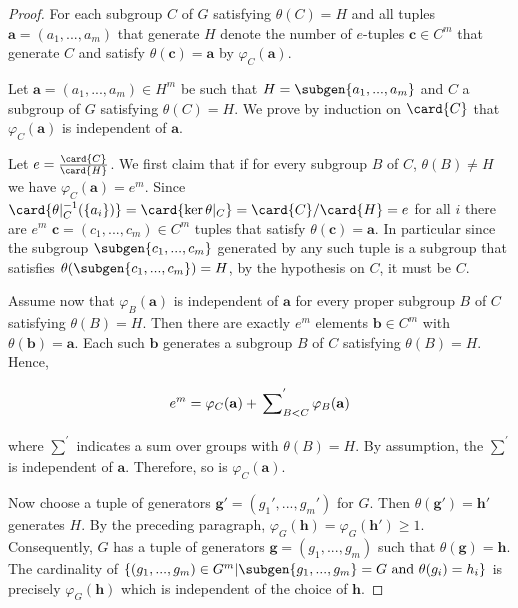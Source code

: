 \begin{proof}
    For each subgroup $C$ of $G$ satisfying $\theta(C) = H$ and all tuples $\mathbf{a} = (a_1,...,a_m)$ that generate $H$ denote the number of $e$-tuples $\mathbf{c} \in C^m$ that generate $C$ and satisfy $\theta(\mathbf{c}) = \mathbf{a}$ by $\varphi_C(\mathbf{a})$. 
    
    Let $\mathbf{a} = (a_1,...,a_m) \in H^m$ be such that $H = \subgen{a_1, ..., a_m}$ and $C$ a subgroup of $G$ satisfying $\theta(C) = H$.
    We prove by induction on $\card{C}$ that $\varphi_C(\mathbf{a})$ is independent of $\mathbf{a}$.

    Let $e = \frac{\card{C}}{\card{H}}$.
    We first claim that if for every subgroup $B$ of $C$, $\theta(B) \ne H$ we have $\varphi_C(\mathbf{a}) = e^m$. Since $\card{\theta|_{C}^{-1}(\{a_i\})} = \card{\ker \theta|_{C}} = \card{C}/\card{H} = e$ for all $i$ there are $e^m$ $\mathbf{c} = (c_1, ..., c_m) \in C^m$ tuples that satisfy $\theta(\mathbf{c}) = \mathbf{a}$. In particular since the subgroup $\subgen{c_1, ..., c_m}$ generated by any such tuple is a subgroup that satisfies $\theta(\subgen{c_1, ..., c_m}) = H$, by the hypothesis on $C$, it must be $C$. 
    
    Assume now that $\varphi_B(\mathbf{a})$ is independent of $\mathbf{a}$ for every proper subgroup $B$ of $C$ satisfying $\theta(B) = H$. Then there are exactly $e^m$ elements $\mathbf{b} \in C^m$ with $\theta(\mathbf{b}) = \mathbf{a}$. Each such $\mathbf{b}$ generates a subgroup $B$ of $C$ satisfying $\theta(B) = H$. Hence,
    $$
    e^m = \varphi_C(\mathbf{a}) + \sideset{}{}{\sum_{B < C}^{'}} \varphi_B(\mathbf{a})
    $$
    where $\sum_{}^{'}$ indicates a sum over groups with $\theta(B) = H$. By assumption, the $\sum_{}^{'}$ is independent of $\mathbf{a}$. Therefore, so is $\varphi_C(\mathbf{a})$.

    Now choose a tuple of generators $\mathbf{g'} = (g_1', ..., g_m')$ for $G$. Then $\theta(\mathbf{g'}) = \mathbf{h'}$ generates $H$. By the preceding paragraph, $\varphi_G(\mathbf{h}) = \varphi_G(\mathbf{h'}) \ge 1$. Consequently, $G$ has a tuple of generators $\mathbf{g} =(g_1, ..., g_m)$ such that $\theta(\mathbf{g}) = \mathbf{h}$. The cardinality of $\left\{(g_1,...,g_m) \in G^m |\subgen{g_1,...,g_m} = G \text{ and } \theta(g_i) = h_i \right\}$ is precisely $\varphi_G(\mathbf{h})$ which is independent of the choice of $\mathbf{h}$.
\end{proof}

